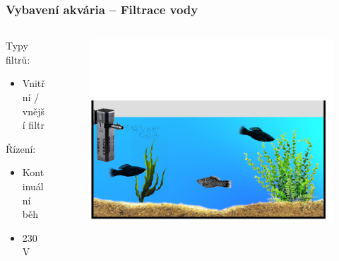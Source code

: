 \documentclass[%
  12pt,       				%
	t,                  %
	aspectratio=1610,   %
	unicode,						%
]{beamer}				    	%
\begin{document}
\begin{frame} 
	\frametitle{Vybavení akvária -- Filtrace vody}
	
	\begin{columns}[T] 								%
		\begin{column}{0.4\textwidth}		%
			Typy filtrů:\\[2ex]
			\begin{itemize}
				\item Vnitřní / vnější filtr
			\end{itemize}

			\vspace{4ex}%
			Řízení:\\[2ex]
			\begin{itemize}
				\item Kontinuální běh
				\item 230\,V
			\end{itemize}
		\end{column}
		\begin{column}{0.6\textwidth}		%
			\begin{figure}%
				\centering
				\includegraphics[width=\columnwidth]{obrazky/prezentace/vybaveni-akvaria/03-filtr.png}
			\end{figure}
		\end{column}
	\end{columns}											%
\end{frame}
\end{document}
